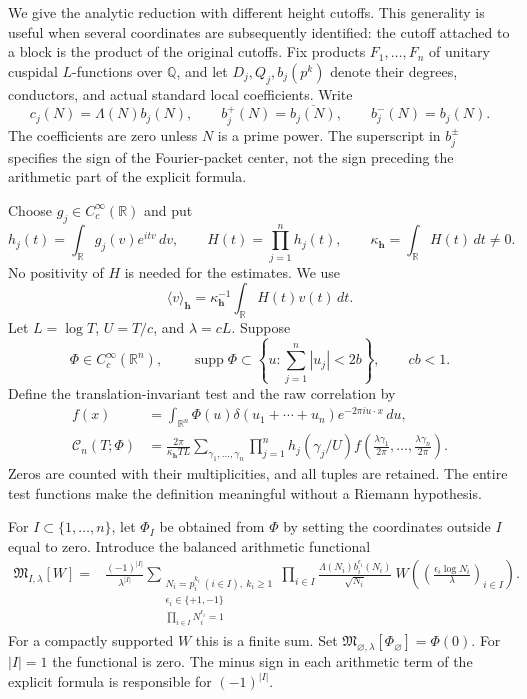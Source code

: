\documentclass[11pt]{article}
\numberwithin{equation}{section}
\theoremstyle{remark}
\begin{document}
We give the analytic reduction with different height cutoffs. This
generality is useful when several coordinates are subsequently identified:
the cutoff attached to a block is the product of the original cutoffs.
Fix products $F_1,\ldots,F_n$ of unitary cuspidal $L$-functions over
$\mathbb Q$, and let $D_j,Q_j,b_j(p^k)$ denote their degrees,
conductors, and actual standard local coefficients. Write
\[
 c_j(N)=\Lambda(N)b_j(N),\qquad
 b_j^+(N)=\overline{b_j(N)},\qquad b_j^-(N)=b_j(N).
\]
The coefficients are zero unless $N$ is a prime power. The superscript
in $b_j^\pm$ specifies the sign of the Fourier-packet center, not the
sign preceding the arithmetic part of the explicit formula.

Choose $g_j\in C_c^\infty(\mathbb R)$ and put
\[
 h_j(t)=\int_{\mathbb R}g_j(v)e^{itv}\,dv,\qquad
 H(t)=\prod_{j=1}^n h_j(t),\qquad
 \kappa_{\boldsymbol h}=\int_{\mathbb R}H(t)\,dt\ne0.
\]
No positivity of $H$ is needed for the estimates. We use
\[
 \langle v\rangle_{\boldsymbol h}
  =\kappa_{\boldsymbol h}^{-1}\int_{\mathbb R}H(t)v(t)\,dt.
\]
Let $L=\log T$, $U=T/c$, and $\lambda=cL$. Suppose
\begin{equation}\label{n:strict-support}
 \Phi\in C_c^\infty(\mathbb R^n),\qquad
 \operatorname{supp}\Phi\subset
 \left\{u:\sum_{j=1}^n|u_j|<2b\right\},\qquad cb<1.
\end{equation}
Define the translation-invariant test and the raw correlation by
\begin{align}
 f(x)&=\int_{\mathbb R^n}\Phi(u)
     \delta(u_1+\cdots+u_n)e^{-2\pi i u\cdot x}\,du,
       \label{n:f-convention}\\
 \mathcal C_n(T;\Phi)&=
 \frac{2\pi}{\kappa_{\boldsymbol h}TL}
 \sum_{\gamma_1,\ldots,\gamma_n}
   \prod_{j=1}^n h_j(\gamma_j/U)
   f\left(\frac{\lambda\gamma_1}{2\pi},\ldots,
          \frac{\lambda\gamma_n}{2\pi}\right).
       \label{n:C-definition}
\end{align}
Zeros are counted with their multiplicities, and all tuples are retained.
The entire test functions make the definition meaningful without a
Riemann hypothesis.

For $I\subset\{1,\ldots,n\}$, let $\Phi_I$ be obtained from $\Phi$
by setting the coordinates outside $I$ equal to zero. Introduce the
balanced arithmetic functional
\begin{equation}\label{n:balanced-moment}
\begin{split}
 \mathfrak M_{I,\lambda}[W]
 ={}&\frac{(-1)^{|I|}}{\lambda^{|I|}}
 \sum_{\substack{N_i=p_i^{k_i}\ (i\in I),\ k_i\ge1\\
                 \epsilon_i\in\{+1,-1\}\\
                 \prod_{i\in I}N_i^{\epsilon_i}=1}}
 \prod_{i\in I}
       \frac{\Lambda(N_i)b_i^{\epsilon_i}(N_i)}{\sqrt{N_i}}
 \ W\left(\left(\frac{\epsilon_i\log N_i}{\lambda}\right)_{i\in I}
        \right).
\end{split}
\end{equation}
For a compactly supported $W$ this is a finite sum. Set
$\mathfrak M_{\varnothing,\lambda}[\Phi_\varnothing]=\Phi(0)$.
For $|I|=1$ the functional is zero. The minus sign in each arithmetic
term of the explicit formula is responsible for $(-1)^{|I|}$.
\end{document}
